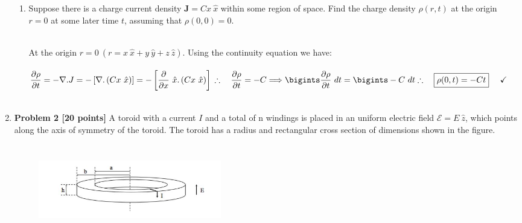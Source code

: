 \documentclass[fleqn]{article}
\begin{document}
\begin{enumerate}
\begin{enumerate}
      \item Suppose there is a charge current density $\mathbf{J}=Cx ~ \hat{x}$ within some region of space. Find the
      charge density $\rho(r, t)$ at the origin $r=0$ at some later time $t$, assuming that $\rho(0, 0)=0$.

        \textcolor{hwColor}{
          \\
          At the origin $r=0 ~ (r=x ~ \hat{x}+y ~ \hat{y}+z ~ \hat{z})$. Using the continuity equation we have:
          \\
          \\
          $
            \dfrac{\partial \rho}{\partial t}=-\nabla.J=-\left[\nabla. \left(Cx ~ \hat{x}\right)\right]
            =-\left[\dfrac{\partial}{\partial x} ~ \hat{x}. \left(Cx ~ \hat{x}\right)\right]
            \\
            \\
            \\
            \therefore ~~~ \dfrac{\partial \rho}{\partial t}=-C 
            \Longrightarrow \bigints \dfrac{\partial \rho}{\partial t} ~ dt
            =\bigints -C ~ dt
            \\
            \\
            \\
            \therefore ~~~ \boxed{
              \rho(0,t)=-Ct 
            } ~~~~ \checkmark
          $
          \\
          \\
        }
      
    \end{enumerate}

    \pagebreak

    \item \textbf{Problem 2 [20 points]} A toroid with a current $I$ and a total of n windings is placed in an uniform
    electric field $\mathcal{E}=E ~ \hat{z}$, which points along the axis of symmetry of the toroid. The toroid has a radius
    and rectangular cross section of dimensions shown in the figure.

      \begin{figure}[h!]
        \centering
        \includegraphics[height=4cm, width=8cm]{One.JPG}
      \end{figure}


\end{enumerate}
\end{document}
